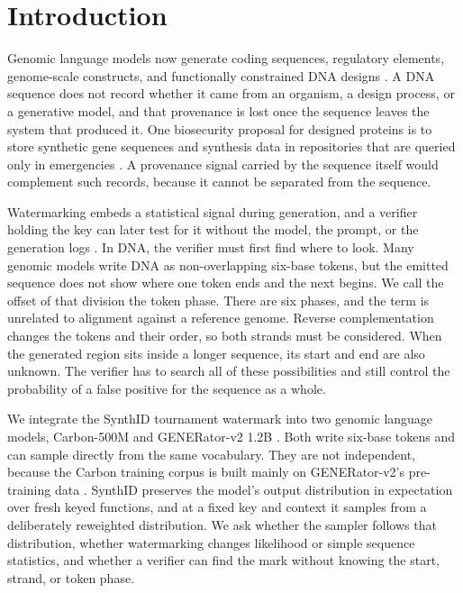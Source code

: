 \documentclass[10pt,twocolumn]{article}
\begin{document}
\thispagestyle{fancy}

\section{Introduction}

Genomic language models now generate coding sequences, regulatory elements, genome-scale
constructs, and functionally constrained DNA designs
\cite{nguyen2024evo,wu2025generator,king2026bacteriophages}. A DNA sequence does not record
whether it came from an organism, a design process, or a generative model, and that provenance is
lost once the sequence leaves the system that produced it. One biosecurity proposal for designed
proteins is to store synthetic gene sequences and synthesis data in repositories that are queried
only in emergencies \cite{baker2024protein}. A provenance signal carried by the sequence itself
would complement such records, because it cannot be separated from the sequence.

Watermarking embeds a statistical signal during generation, and a verifier holding the key can
later test for it without the model, the prompt, or the generation logs
\cite{kirchenbauer2023watermark}. In DNA, the verifier must first find where to look. Many genomic
models write DNA as non-overlapping six-base tokens, but the emitted sequence does not show where
one token ends and the next begins. We call the offset of that division the token phase. There are
six phases, and the term is unrelated to alignment against a reference genome. Reverse
complementation changes the tokens and their order, so both strands must be considered. When the generated region sits inside a longer sequence, its start and end are also
unknown. The verifier has to search all of these possibilities and still control the probability
of a false positive for the sequence as a whole.

We integrate the SynthID tournament watermark \cite{dathathri2024scalable} into two genomic
language models, Carbon-500M \cite{carbon2026,carbon500m} and GENERator-v2 1.2B
\cite{generatorv22026,generatorv2checkpoint}. Both write six-base tokens and can sample directly
from the same vocabulary. They are not independent, because the Carbon training corpus is built
mainly on GENERator-v2's pre-training data \cite{carbon2026}. SynthID preserves the model's output
distribution in expectation over fresh keyed functions, and at a fixed key and context it samples
from a deliberately reweighted distribution. We ask whether the sampler follows that distribution,
whether watermarking changes likelihood or simple sequence statistics, and whether a verifier can
find the mark without knowing the start, strand, or token phase.
\end{document}
